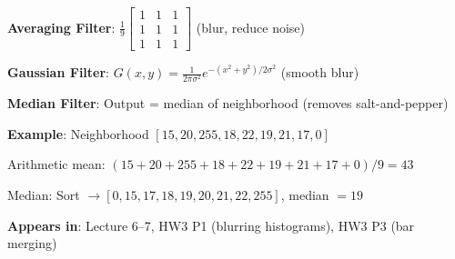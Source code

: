 \documentclass[10pt]{article}
\begin{document}
\begin{conceptbox}

\begin{formulabox}
\textbf{Averaging Filter}: $\frac{1}{9}\begin{bmatrix} 1 & 1 & 1 \\ 1 & 1 & 1 \\ 1 & 1 & 1 \end{bmatrix}$ \hfill (blur, reduce noise)

\textbf{Gaussian Filter}: $G(x,y) = \frac{1}{2\pi\sigma^2}e^{-(x^2+y^2)/2\sigma^2}$ \hfill (smooth blur)

\textbf{Median Filter}: Output = median of neighborhood \hfill (removes salt-and-pepper)
\end{formulabox}

\begin{examplebox}
\textbf{Example}: Neighborhood $[15, 20, 255, 18, 22, 19, 21, 17, 0]$

Arithmetic mean: $(15+20+255+18+22+19+21+17+0)/9 = 43$

Median: Sort $\to [0,15,17,18,19,20,21,22,255]$, median $= 19$
\end{examplebox}

\textbf{Appears in}: Lecture 6--7, HW3 P1 (blurring histograms), HW3 P3 (bar merging)

\end{conceptbox}

\end{document}
